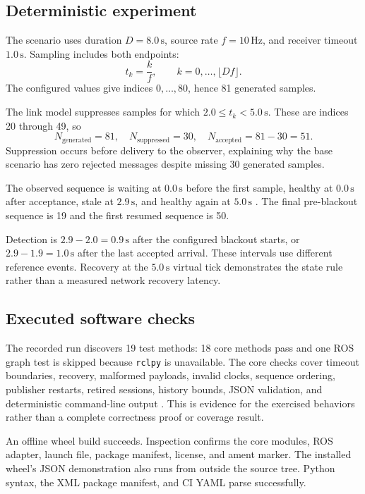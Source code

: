 \documentclass[11pt,a4paper]{article}
\newcommand{\code}[1]{\texttt{#1}}
\begin{document}
\subsection{Deterministic experiment}
The scenario uses duration $D=8.0\,\mathrm{s}$, source rate $f=10\,\mathrm{Hz}$,
and receiver timeout $1.0\,\mathrm{s}$. Sampling includes both endpoints:
\begin{equation}
t_k=\frac{k}{f},\qquad k=0,\ldots,\lfloor Df\rfloor.
\label{eq:samples}
\end{equation}
The configured values give indices $0,\ldots,80$, hence 81 generated samples.

The link model suppresses samples for which $2.0\leq t_k<5.0\,\mathrm{s}$.
These are indices 20 through 49, so
\begin{equation}
N_{\mathrm{generated}}=81,\quad
N_{\mathrm{suppressed}}=30,\quad
N_{\mathrm{accepted}}=81-30=51.
\label{eq:counts}
\end{equation}
Suppression occurs before delivery to the observer, explaining why the base
scenario has zero rejected messages despite missing 30 generated samples.

The observed sequence is waiting at $0.0\,\mathrm{s}$ before the first sample,
healthy at $0.0\,\mathrm{s}$ after acceptance, stale at $2.9\,\mathrm{s}$, and healthy
again at $5.0\,\mathrm{s}$ \cite{artifact}. The final pre-blackout sequence is 19
and the first resumed sequence is 50.

Detection is $2.9-2.0=0.9\,\mathrm{s}$ after the configured blackout starts, or
$2.9-1.9=1.0\,\mathrm{s}$ after the last accepted arrival. These intervals use
different reference events. Recovery at the $5.0\,\mathrm{s}$ virtual tick
demonstrates the state rule rather than a measured network recovery latency.

\subsection{Executed software checks}
The recorded run discovers 19 test methods: 18 core methods pass and one ROS graph
test is skipped because \code{rclpy} is unavailable. The core checks cover timeout
boundaries, recovery, malformed payloads, invalid clocks, sequence ordering,
publisher restarts, retired sessions, history bounds, JSON validation, and
deterministic command-line output \cite{artifact}. This is evidence for the
exercised behaviors rather than a complete correctness proof or coverage result.

An offline wheel build succeeds. Inspection confirms the core modules, ROS
adapter, launch file, package manifest, license, and ament marker. The installed
wheel's JSON demonstration also runs from outside the source tree. Python syntax,
the XML package manifest, and CI YAML parse successfully.
\end{document}
